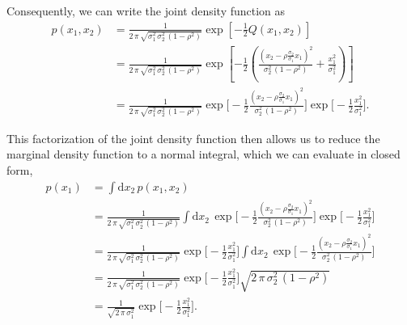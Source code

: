 \documentclass[11pt, oneside]{article}
\begin{document}
Consequently, we can write the joint density function as
%
\begin{align*}
p( x_{1}, x_{2} )
&=
\frac{1}{ 2 \, \pi \, \sqrt{ \sigma_{1}^{2} \, \sigma_{2}^{2} \, (1 - \rho^{2} ) } }
\exp \left[
  -\frac{1}{2} Q( x_{1}, x_{2} )
\right]
\\
&=
\frac{1}{ 2 \, \pi \, \sqrt{ \sigma_{1}^{2} \, \sigma_{2}^{2} \, (1 - \rho^{2} ) } }
\exp \left[
  -\frac{1}{2} \left(
      \frac{ 
      \left(
        x_{2} - \rho \frac{ \sigma_{2} }{ \sigma_{1} } x_{1}
      \right)^{2}
    }{
      \sigma_{2}^{2} \, (1 - \rho^{2} )
    }
    +
    \frac{  x_{1}^{2} }{ \sigma_{1}^{2} }
  \right)
\right]
\\
&=
\frac{1}{ 2 \, \pi \, \sqrt{ \sigma_{1}^{2} \, \sigma_{2}^{2} \, (1 - \rho^{2} ) } }
\exp \Bigg[
  -\frac{1}{2}
      \frac{ 
      \left(
        x_{2} - \rho \frac{ \sigma_{2} }{ \sigma_{1} } x_{1}
      \right)^{2}
    }{
      \sigma_{2}^{2} \, (1 - \rho^{2} )
    }
\Bigg]
\exp \Bigg[
  -\frac{1}{2} \frac{  x_{1}^{2} }{ \sigma_{1}^{2} }
\Bigg].
\end{align*}

This factorization of the joint density function then allows us to reduce the 
marginal density function to a normal integral, which we can evaluate in 
closed form,
%
\begin{align*}
p ( x_{1} )
&=
\int \mathrm{d} x_{2} \, 
p( x_{1}, x_{2} )
\\
&=
\frac{1}{ 2 \, \pi \, \sqrt{ \sigma_{1}^{2} \, \sigma_{2}^{2} \, (1 - \rho^{2} ) } }
\int \mathrm{d} x_{2} \, 
\exp \Bigg[
  -\frac{1}{2}
    \frac{ 
      \left(
        x_{2} - \rho \frac{ \sigma_{2} }{ \sigma_{1} } x_{1}
      \right)^{2}
    }{
      \sigma_{2}^{2} \, (1 - \rho^{2} )
    }
\Bigg]
\exp \Bigg[
  -\frac{1}{2} \frac{  x_{1}^{2} }{ \sigma_{1}^{2} }
\Bigg]
\\
&=
\frac{1}{ 2 \, \pi \, \sqrt{ \sigma_{1}^{2} \, \sigma_{2}^{2} \, (1 - \rho^{2} ) } }
\exp \Bigg[
  -\frac{1}{2} \frac{  x_{1}^{2} }{ \sigma_{1}^{2} }
\Bigg]
\int \mathrm{d} x_{2} \, 
\exp \Bigg[
  -\frac{1}{2}
    \frac{ 
      \left(
        x_{2} - \rho \frac{ \sigma_{2} }{ \sigma_{1} } x_{1}
      \right)^{2}
    }{
      \sigma_{2}^{2} \, (1 - \rho^{2} )
    }
\Bigg]
\\
&=
\frac{1}{ 2 \, \pi \, \sqrt{ \sigma_{1}^{2} \, \sigma_{2}^{2} \, (1 - \rho^{2} ) } }
\exp \Bigg[
  -\frac{1}{2} \frac{  x_{1}^{2} }{ \sigma_{1}^{2} }
\Bigg]
\sqrt{ 2 \, \pi \, \sigma_{2}^{2} \, (1 - \rho^{2} ) }
\\
&=
\frac{1}{ \sqrt{2 \, \pi \, \sigma_{1}^{2} } }
\exp \Bigg[
  -\frac{1}{2} \frac{  x_{1}^{2} }{ \sigma_{1}^{2} }
\Bigg].
\end{align*}
\end{document}
